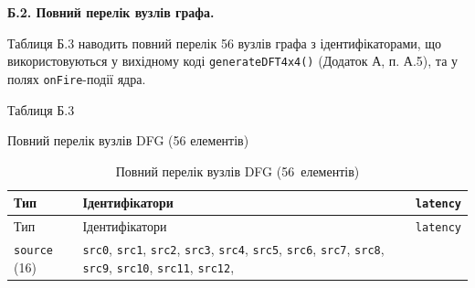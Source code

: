 \documentclass[
]{article}
\newcommand{\passthrough}[1]{#1}
\begin{document}
\textbf{Б.2. Повний перелік вузлів графа.}

Таблиця Б.3 наводить повний перелік 56 вузлів графа з ідентифікаторами,
що використовуються у вихідному коді
\passthrough{\lstinline!generateDFT!}\passthrough{\lstinline!4!}\passthrough{\lstinline!x!}\passthrough{\lstinline!4()!}
(Додаток А, п. А.5), та у полях \passthrough{\lstinline!onFire!}-події
ядра.

Таблиця Б.3

Повний перелік вузлів DFG (56 елементів)

\begin{longtable}[]{@{}
  >{\raggedright\arraybackslash}p{}
  >{\raggedright\arraybackslash}p{}
  >{\raggedright\arraybackslash}p{}@{}}
\caption[Повний перелік вузлів DFG (56~елементів)]{Повний перелік вузлів
DFG (56~елементів)}\tabularnewline
\toprule\noalign{}
\begin{minipage}[b]{\linewidth}\raggedright
Тип
\end{minipage} & \begin{minipage}[b]{\linewidth}\raggedright
Ідентифікатори
\end{minipage} & \begin{minipage}[b]{\linewidth}\raggedright
\passthrough{\lstinline!latency!}
\end{minipage} \\
\midrule\noalign{}
\endfirsthead
\toprule\noalign{}
\begin{minipage}[b]{\linewidth}\raggedright
Тип
\end{minipage} & \begin{minipage}[b]{\linewidth}\raggedright
Ідентифікатори
\end{minipage} & \begin{minipage}[b]{\linewidth}\raggedright
\passthrough{\lstinline!latency!}
\end{minipage} \\
\midrule\noalign{}
\endhead
\bottomrule\noalign{}
\endlastfoot
\passthrough{\lstinline!source!} (16) & \passthrough{\lstinline!src0!},
\passthrough{\lstinline!src1!}, \passthrough{\lstinline!src2!},
\passthrough{\lstinline!src3!}, \passthrough{\lstinline!src4!},
\passthrough{\lstinline!src5!}, \passthrough{\lstinline!src6!},
\passthrough{\lstinline!src7!}, \passthrough{\lstinline!src8!},
\passthrough{\lstinline!src9!}, \passthrough{\lstinline!src10!},
\passthrough{\lstinline!src11!}, \passthrough{\lstinline!src12!},

\end{longtable}
\end{document}
